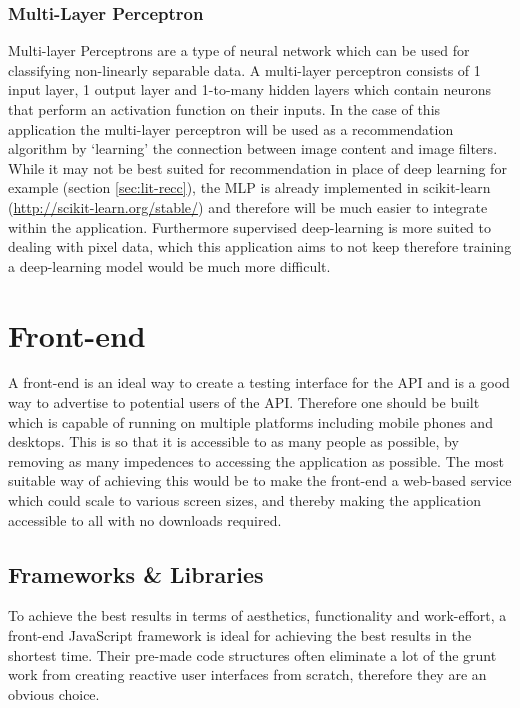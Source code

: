 \documentclass[a4paper,12pt]{report}
\begin{document}
      \subsubsection{Multi-Layer Perceptron} \label{sec:mlp}
        Multi-layer Perceptrons \citep{minsky2017perceptrons} are a type of neural network which can be used for classifying non-linearly separable data. A multi-layer perceptron consists of 1 input layer, 1 output layer and 1-to-many hidden layers which contain neurons that perform an activation function on their inputs. In the case of this application the multi-layer perceptron will be used as a recommendation algorithm by ‘learning’ the connection between image content and image filters. While it may not be best suited for recommendation in place of deep learning for example (section \ref{sec:lit-recc}), the MLP is already implemented in scikit-learn (\url{http://scikit-learn.org/stable/}) and therefore will be much easier to integrate within the application. Furthermore supervised deep-learning is more suited to dealing with pixel data, which this application aims to not keep therefore training a deep-learning model would be much more difficult.

  \section{Front-end}
    A front-end is an ideal way to create a testing interface for the API and is a good way to advertise to potential users of the API. Therefore one should be built which is capable of running on multiple platforms including mobile phones and desktops. This is so that it is accessible to as many people as possible, by removing as many impedences to accessing the application as possible. The most suitable way of achieving this would be to make the front-end a web-based service which could scale to various screen sizes, and thereby making the application accessible to all with no downloads required.

    \subsection{Frameworks \& Libraries} %
      To achieve the best results in terms of aesthetics, functionality and work-effort, a front-end JavaScript framework is ideal for achieving the best results in the shortest time. Their pre-made code structures often eliminate a lot of the grunt work from creating reactive user interfaces from scratch, therefore they are an obvious choice.
\end{document}
